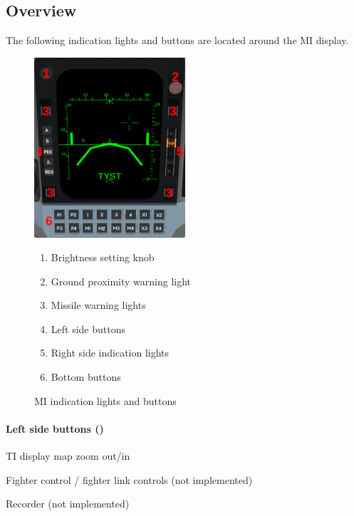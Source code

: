 \subsection{Overview}
\label{sec:mi-overview}
The following indication lights and buttons are located around the MI display.
\begin{figure}[!ht]
  \centering
  \includegraphics[width=0.5\textwidth]{images/displays/MI-overview.png}

  \begin{multicols}{2}
    \begin{enumerate}[nosep]
      \item \label{item:brightness} Brightness setting knob
      \item \label{item:gpw} Ground proximity warning light
      \item \label{item:mlw} Missile warning lights
      \item \label{item:buttons} Left side buttons
      \item \label{item:lights} Right side indication lights
      \item \label{item:bot-buttons} Bottom buttons
    \end{enumerate}
  \end{multicols}

  \caption{MI indication lights and buttons}
  \label{fig:mi}
\end{figure}

\paragraph{Left side buttons ()}
\begin{description}[nosep]
  \item[A/B] TI display map zoom out/in
  \item[PEK/JL] Fighter control / fighter link controls (not implemented)
  \item[REG] Recorder (not implemented)
\end{description}

